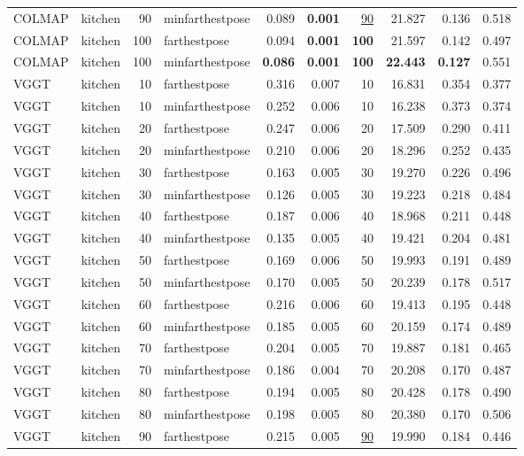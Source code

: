 \begin{table}[H]
\begin{tabular}{llrlrrrrrr}
COLMAP & kitchen & 90 & minfarthestpose & 0.089 & \textbf{0.001} & \underline{90} & 21.827 & 0.136 & 0.518 \\
COLMAP & kitchen & 100 & farthestpose & 0.094 & \textbf{0.001} & \textbf{100} & 21.597 & 0.142 & 0.497 \\
COLMAP & kitchen & 100 & minfarthestpose & \textbf{0.086} & \textbf{0.001} & \textbf{100} & \textbf{22.443} & \textbf{0.127} & 0.551 \\
VGGT & kitchen & 10 & farthestpose & 0.316 & 0.007 & 10 & 16.831 & 0.354 & 0.377 \\
VGGT & kitchen & 10 & minfarthestpose & 0.252 & 0.006 & 10 & 16.238 & 0.373 & 0.374 \\
VGGT & kitchen & 20 & farthestpose & 0.247 & 0.006 & 20 & 17.509 & 0.290 & 0.411 \\
VGGT & kitchen & 20 & minfarthestpose & 0.210 & 0.006 & 20 & 18.296 & 0.252 & 0.435 \\
VGGT & kitchen & 30 & farthestpose & 0.163 & 0.005 & 30 & 19.270 & 0.226 & 0.496 \\
VGGT & kitchen & 30 & minfarthestpose & 0.126 & 0.005 & 30 & 19.223 & 0.218 & 0.484 \\
VGGT & kitchen & 40 & farthestpose & 0.187 & 0.006 & 40 & 18.968 & 0.211 & 0.448 \\
VGGT & kitchen & 40 & minfarthestpose & 0.135 & 0.005 & 40 & 19.421 & 0.204 & 0.481 \\
VGGT & kitchen & 50 & farthestpose & 0.169 & 0.006 & 50 & 19.993 & 0.191 & 0.489 \\
VGGT & kitchen & 50 & minfarthestpose & 0.170 & 0.005 & 50 & 20.239 & 0.178 & 0.517 \\
VGGT & kitchen & 60 & farthestpose & 0.216 & 0.006 & 60 & 19.413 & 0.195 & 0.448 \\
VGGT & kitchen & 60 & minfarthestpose & 0.185 & 0.005 & 60 & 20.159 & 0.174 & 0.489 \\
VGGT & kitchen & 70 & farthestpose & 0.204 & 0.005 & 70 & 19.887 & 0.181 & 0.465 \\
VGGT & kitchen & 70 & minfarthestpose & 0.186 & 0.004 & 70 & 20.208 & 0.170 & 0.487 \\
VGGT & kitchen & 80 & farthestpose & 0.194 & 0.005 & 80 & 20.428 & 0.178 & 0.490 \\
VGGT & kitchen & 80 & minfarthestpose & 0.198 & 0.005 & 80 & 20.380 & 0.170 & 0.506 \\
VGGT & kitchen & 90 & farthestpose & 0.215 & 0.005 & \underline{90} & 19.990 & 0.184 & 0.446 \\

\end{tabular}
\end{table}
